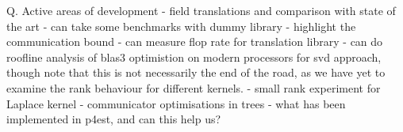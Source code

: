 Q. Active areas of development
    - field translations and comparison with state of the art
        - can take some benchmarks with dummy library
        - highlight the communication bound
        - can measure flop rate for translation library
        - can do roofline analysis of blas3 optimistion on modern
        processors for svd approach, though note that this is not
        necessarily the end of the road, as we have yet to examine
        the rank behaviour for different kernels.
        - small rank experiment for Laplace kernel
    - communicator optimisations in trees
        - what has been implemented in p4est, and can this help us?


